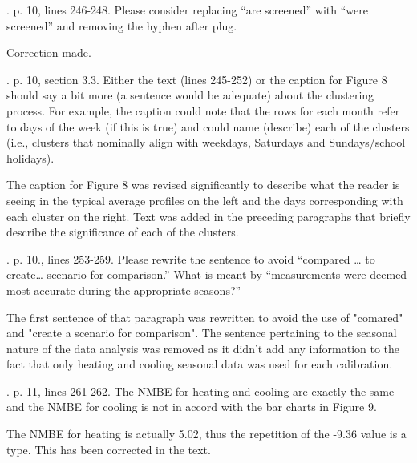 \documentclass[answers,12pt]{exam}
\begin{document}
\begin{questions}
. p. 10, lines 246-248.  Please consider replacing “are screened” with “were screened” and removing the hyphen after plug. 
\begin{solution}
Correction made.
\end{solution}

. p. 10, section 3.3.  Either the text (lines 245-252) or the caption for Figure 8 should say a bit more (a sentence would be adequate) about the clustering process.  For example, the caption could note that the rows for each month refer to days of the week (if this is true) and could name (describe) each of the clusters (i.e., clusters that nominally align with weekdays, Saturdays and Sundays/school holidays). 
\begin{solution}
The caption for Figure 8 was revised significantly to describe what the reader is seeing in the typical average profiles on the left and the days corresponding with
each cluster on the right. Text was added in the preceding paragraphs that briefly describe the significance of each of the clusters.
\end{solution}

. p. 10., lines 253-259.  Please rewrite the sentence to avoid “compared … to create… scenario for comparison.” What is meant by “measurements were deemed most accurate during the appropriate seasons?”
\begin{solution}
The first sentence of that paragraph was rewritten to avoid the use of "comared" and "create a scenario for comparison". The sentence pertaining to the seasonal nature of the data analysis was removed as it didn't add any information to the fact that only heating and cooling seasonal data was used for each calibration.
\end{solution}

. p. 11, lines 261-262.  The NMBE for heating and cooling are exactly the same and the NMBE for cooling is not in accord with the bar charts in Figure 9. 
\begin{solution}
The NMBE for heating is actually 5.02, thus the repetition of the -9.36 value is a type. This has been corrected in the text.
\end{solution}


\end{questions}
\end{document}
